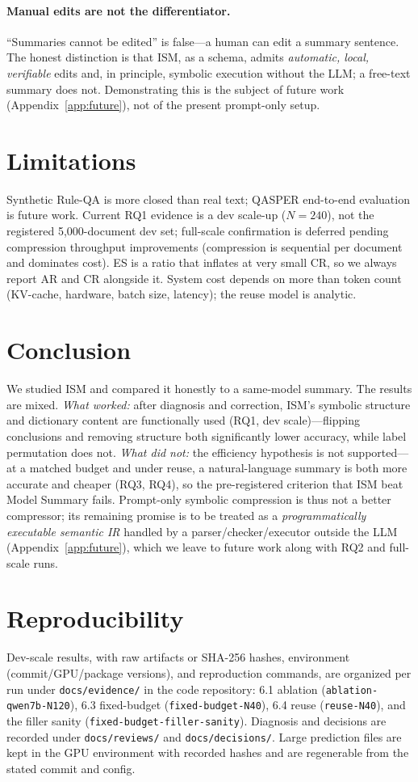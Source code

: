 \documentclass{article}
\begin{document}
\paragraph{Manual edits are not the differentiator.}
``Summaries cannot be edited'' is false---a human can edit a summary sentence. The
honest distinction is that ISM, as a schema, admits \emph{automatic, local,
verifiable} edits and, in principle, symbolic execution without the LLM; a free-text
summary does not. Demonstrating this is the subject of future work
(Appendix~\ref{app:future}), not of the present prompt-only setup.

\section{Limitations}
Synthetic Rule-QA is more closed than real text; QASPER end-to-end evaluation is
future work. Current RQ1 evidence is a dev scale-up ($N{=}240$), not the registered
5{,}000-document dev set; full-scale confirmation is deferred pending compression
throughput improvements (compression is sequential per document and dominates
cost). ES is a ratio that inflates at very small CR, so we always report AR and CR
alongside it. System cost depends on more than token count (KV-cache, hardware,
batch size, latency); the reuse model is analytic.

\section{Conclusion}
We studied ISM and compared it honestly to a same-model summary. The results are
mixed. \emph{What worked:} after diagnosis and correction, ISM's symbolic structure
and dictionary content are functionally used (RQ1, dev scale)---flipping
conclusions and removing structure both significantly lower accuracy, while label
permutation does not. \emph{What did not:} the efficiency hypothesis is not
supported---at a matched budget and under reuse, a natural-language summary is both
more accurate and cheaper (RQ3, RQ4), so the pre-registered criterion that ISM beat
Model Summary fails. Prompt-only symbolic compression is thus not a better
compressor; its remaining promise is to be treated as a \emph{programmatically
executable semantic IR} handled by a parser/checker/executor outside the LLM
(Appendix~\ref{app:future}), which we leave to future work along with RQ2 and
full-scale runs.

\section*{Reproducibility}
Dev-scale results, with raw artifacts or SHA-256 hashes, environment
(commit/GPU/package versions), and reproduction commands, are organized per run
under \texttt{docs/evidence/} in the code repository: 6.1 ablation
(\texttt{ablation-qwen7b-N120}), 6.3 fixed-budget (\texttt{fixed-budget-N40}), 6.4
reuse (\texttt{reuse-N40}), and the filler sanity
(\texttt{fixed-budget-filler-sanity}). Diagnosis and decisions are recorded under
\texttt{docs/reviews/} and \texttt{docs/decisions/}. Large prediction files are kept
in the GPU environment with recorded hashes and are regenerable from the stated
commit and config.
\end{document}
